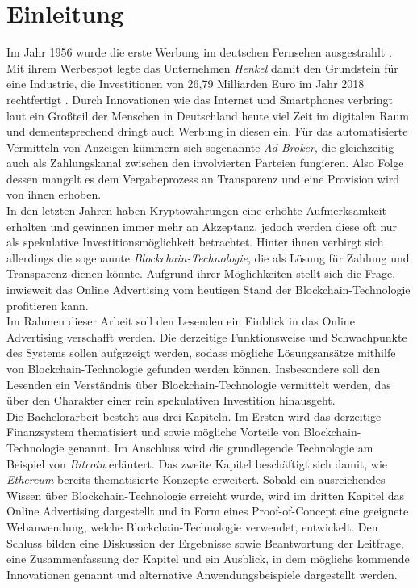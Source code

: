 \chapter{Einleitung}
Im Jahr 1956 wurde die erste Werbung im deutschen Fernsehen ausgestrahlt \cite[]{tagesspiegel_2016}. Mit ihrem Werbespot legte das Unternehmen \emph{Henkel} damit den Grundstein für eine Industrie, die Investitionen von 26,79 Milliarden Euro im Jahr 2018 rechtfertigt \cite[]{statista_werbung_2020}. Durch Innovationen wie das Internet und Smartphones verbringt laut \cite{statista_internetnutzung_2020} ein Großteil der Menschen in Deutschland heute viel Zeit im digitalen Raum und dementsprechend dringt auch Werbung in diesen ein. Für das automatisierte Vermitteln von Anzeigen kümmern sich sogenannte \emph{Ad-Broker}, die gleichzeitig auch als Zahlungskanal zwischen den involvierten Parteien fungieren. Also Folge dessen mangelt es dem Vergabeprozess an Transparenz und eine Provision wird von ihnen erhoben.\\

In den letzten Jahren haben Kryptowährungen eine erhöhte Aufmerksamkeit erhalten und gewinnen immer mehr an Akzeptanz, jedoch werden diese oft nur als spekulative Investitionsmöglichkeit betrachtet. Hinter ihnen verbirgt sich allerdings die sogenannte \emph{Blockchain-Technologie}, die als Lösung für Zahlung und Transparenz dienen könnte. Aufgrund ihrer Möglichkeiten stellt sich die Frage, inwieweit das Online Advertising vom heutigen Stand der Blockchain-Technologie profitieren kann.\\

Im Rahmen dieser Arbeit soll den Lesenden ein Einblick in das Online Advertising verschafft werden. Die derzeitige Funktionsweise und Schwachpunkte des Systems sollen aufgezeigt werden, sodass mögliche Lösungsansätze mithilfe von Blockchain-Technologie gefunden werden können. Insbesondere soll den Lesenden ein Verständnis über Blockchain-Technologie vermittelt werden, das über den Charakter einer rein spekulativen Investition hinausgeht.\\

Die Bachelorarbeit besteht aus drei Kapiteln. Im Ersten wird das derzeitige Finanzsystem thematisiert und sowie mögliche Vorteile von Blockchain-Technologie genannt. Im Anschluss wird die grundlegende Technologie am Beispiel von \emph{Bitcoin} erläutert. Das zweite Kapitel beschäftigt sich damit, wie \emph{Ethereum} bereits thematisierte Konzepte erweitert. Sobald ein ausreichendes Wissen über Blockchain-Technologie erreicht wurde, wird im dritten Kapitel das Online Advertising dargestellt und in Form eines Proof-of-Concept eine geeignete Webanwendung, welche Blockchain-Technologie verwendet, entwickelt. Den Schluss bilden eine Diskussion der Ergebnisse sowie Beantwortung der Leitfrage, eine Zusammenfassung der Kapitel und ein Ausblick, in dem mögliche kommende Innovationen genannt und alternative Anwendungsbeispiele dargestellt werden. 

